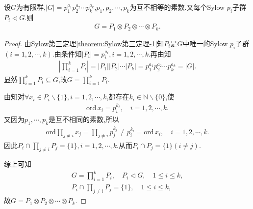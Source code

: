\documentclass[../../main.tex]{subfiles}%
\begin{document}
\begin{proposition}\label{proposition:抽象代数--群的内直积分解}
设$G$为有限群,$|G|=p_1^{a_1}p_2^{a_2}\cdots p_k^{a_k}$,$p_1,p_2,\cdots,p_k$为互不相等的素数.又每个Sylow $p_i$子群$P_i\lhd G$.则
\begin{align*}
G=P_1\otimes P_2\otimes\cdots\otimes P_k.
\end{align*}
\end{proposition}
\begin{proof}
由\hyperref[theorem:Sylow第三定理-1]{Sylow第三定理\ref{theorem:Sylow第三定理-1}}知$P_i$是$G$中唯一的Sylow $p_i$子群$(i=1,2,\cdots,k)$.由条件知$|P_i|=p_{i}^{a_i},i=1,2,\cdots,k$.再由知
\begin{align*}
\left| \prod\limits_{i=1}^k{P_i} \right|=|P_1||P_2|\cdots|P_k|=p_{1}^{a_1}p_{2}^{a_2}\cdots p_{k}^{a_k}=|G|.
\end{align*}
显然$\prod\limits_{i=1}^k{P_i}\subseteq G$,故$G=\prod\limits_{i=1}^k{P_i}$.

由知对$\forall x_i\in P_i\backslash\{1\},i=1,2,\cdots,k$,都存在$k_i\in\mathbb{N}\backslash\{0\}$,使
\begin{align*}
\mathrm{ord}\,x_i=p_{i}^{k_i},\quad i=1,2,\cdots,k.
\end{align*}
又因为$p_1,\cdots,p_k$是互不相同的素数,所以
\begin{align*}
\mathrm{ord}\prod\limits_{j\ne i}{x_j}=\prod\limits_{j\ne i}{p_{j}^{k_j}}\ne p_{i}^{k_i}=\mathrm{ord}\,x_i,\quad i=1,2,\cdots,k.
\end{align*}
因此$P_i\cap\prod\limits_{j\ne i}{P_j}=\{1\},i=1,2,\cdots,k$.从而$P_i\cap P_j=\{1\}(i\ne j)$.

综上可知
\begin{gather*}
G=\prod_{i=1}^k{P_i},\quad P_i\lhd G,\quad 1\leqslant i\leqslant k,
\\
P_i\cap \prod_{j\ne i}{P_j=\{1\},\quad 1}\leqslant i\leqslant k,
\end{gather*}
故$G=P_1\otimes P_2\otimes\cdots\otimes P_k$.



\end{proof}
\end{document}

